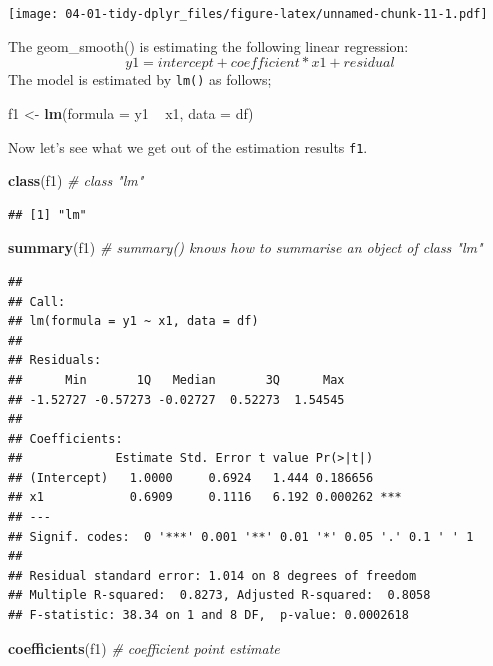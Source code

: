 \documentclass[]{book}
\newenvironment{Shaded}{\begin{snugshade}}{\end{snugshade}}
\newcommand{\KeywordTok}[1]{\textcolor[rgb]{0.13,0.29,0.53}{\textbf{{#1}}}}
\newcommand{\DataTypeTok}[1]{\textcolor[rgb]{0.13,0.29,0.53}{{#1}}}
\newcommand{\StringTok}[1]{\textcolor[rgb]{0.31,0.60,0.02}{{#1}}}
\newcommand{\CommentTok}[1]{\textcolor[rgb]{0.56,0.35,0.01}{\textit{{#1}}}}
\newcommand{\NormalTok}[1]{{#1}}
\theoremstyle{definition}
\theoremstyle{definition}
\theoremstyle{remark}
\begin{document}
\texttt{[image: 04-01-tidy-dplyr\_files/figure-latex/unnamed-chunk-11-1.pdf]}

The geom\_smooth() is estimating the following linear regression:
\[ y1 = intercept + coefficient * x1 + residual\] The model is estimated
by \texttt{lm()} as follows;

\begin{Shaded}
\begin{Highlighting}[]
\NormalTok{f1 <-}\StringTok{ }\KeywordTok{lm}\NormalTok{(}\DataTypeTok{formula =} \NormalTok{y1 ~}\StringTok{ }\NormalTok{x1,  }\DataTypeTok{data =} \NormalTok{df) }
\end{Highlighting}
\end{Shaded}

Now let's see what we get out of the estimation results \texttt{f1}.

\begin{Shaded}
\begin{Highlighting}[]
\KeywordTok{class}\NormalTok{(f1)    }\CommentTok{# class "lm"}
\end{Highlighting}
\end{Shaded}

\begin{verbatim}
## [1] "lm"
\end{verbatim}

\begin{Shaded}
\begin{Highlighting}[]
\KeywordTok{summary}\NormalTok{(f1)  }\CommentTok{# summary() knows how to summarise an object of class "lm" }
\end{Highlighting}
\end{Shaded}

\begin{verbatim}
## 
## Call:
## lm(formula = y1 ~ x1, data = df)
## 
## Residuals:
##      Min       1Q   Median       3Q      Max 
## -1.52727 -0.57273 -0.02727  0.52273  1.54545 
## 
## Coefficients:
##             Estimate Std. Error t value Pr(>|t|)    
## (Intercept)   1.0000     0.6924   1.444 0.186656    
## x1            0.6909     0.1116   6.192 0.000262 ***
## ---
## Signif. codes:  0 '***' 0.001 '**' 0.01 '*' 0.05 '.' 0.1 ' ' 1
## 
## Residual standard error: 1.014 on 8 degrees of freedom
## Multiple R-squared:  0.8273, Adjusted R-squared:  0.8058 
## F-statistic: 38.34 on 1 and 8 DF,  p-value: 0.0002618
\end{verbatim}

\begin{Shaded}
\begin{Highlighting}[]
\KeywordTok{coefficients}\NormalTok{(f1)  }\CommentTok{# coefficient point estimate}
\end{Highlighting}
\end{Shaded}
\end{document}
